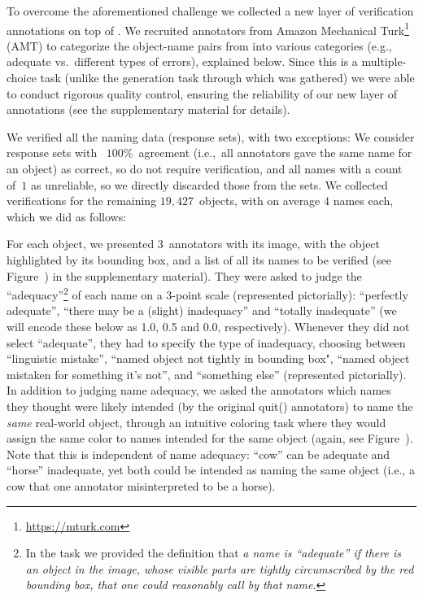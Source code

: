 To overcome the aforementioned challenge we collected a new layer of verification annotations on top of \mn.
We recruited annotators from Amazon Mechanical Turk\footnote{
	\url{https://mturk.com}
} (AMT) to categorize the object-name pairs from \mn into various categories (e.g., adequate vs.\ different types of errors), explained below.
Since this is a multiple-choice task (unlike the generation task through which \mn was gathered) we were able to conduct rigorous quality control, ensuring the reliability of our new layer of annotations (see the supplementary material for details).

We verified all the \mn naming data (response sets), with two exceptions: 
We consider response sets with ~$100$\%~agreement (i.e.,~all annotators gave the same name for an object) as correct, so do not require verification, and all names with a count of~$1$ as unreliable, so we directly discarded those from the sets.
We collected verifications for the remaining $19,427$~objects, with on average $4$ names each, which we did as follows:

For each object, we presented $3$~annotators with its image, with the object highlighted by its bounding box, and a list of all its names to be verified (see Figure~) in the supplementary material).
They were asked to judge the ``adequacy''\footnote{
	In the task we provided the definition that \textit{a name is ``adequate'' if there is an object in the image, whose visible parts are tightly circumscribed by the red bounding box, that one could reasonably call by that name}.
} of each name on a 3-point scale (represented pictorially): ``perfectly adequate'', ``there may be a (slight) inadequacy'' and ``totally inadequate'' (we will encode these below as 1.0, 0.5 and 0.0, respectively).
Whenever they did not select ``adequate'', they had to specify the type of inadequacy, choosing between ``linguistic mistake'', ``named object not tightly in bounding box",  ``named object mistaken for something it's not'', and ``something else'' (represented pictorially).
In addition to judging name adequacy, we asked the annotators which names they thought were likely intended (by the original    quit()
 \mn annotators) to name the \textit{same} real-world object, 
through an intuitive coloring task where they would assign the same color to names intended for the same object (again, see Figure~).
Note that this is independent of name adequacy: ``cow'' can be adequate and ``horse'' inadequate, yet both could be intended as naming the same object (i.e., a cow that one annotator misinterpreted to be a horse).

